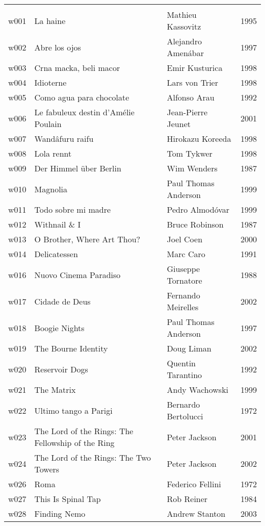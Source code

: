 \documentclass{article}
\begin{document}
\begin {center}
\begin{longtable}{l p{10cm} l l}
\hline
\\
w001 & La haine & Mathieu Kassovitz & 1995 \\
w002 & Abre los ojos & Alejandro Amenábar & 1997 \\
w003 & Crna macka, beli macor & Emir Kusturica & 1998 \\
w004 & Idioterne & Lars von Trier & 1998 \\
w005 & Como agua para chocolate & Alfonso Arau & 1992 \\
w006 & Le fabuleux destin d'Amélie Poulain & Jean-Pierre Jeunet & 2001 \\
w007 & Wandâfuru raifu & Hirokazu Koreeda & 1998 \\
w008 & Lola rennt & Tom Tykwer & 1998 \\
w009 & Der Himmel über Berlin & Wim Wenders & 1987 \\
w010 & Magnolia & Paul Thomas Anderson & 1999 \\
w011 & Todo sobre mi madre & Pedro Almodóvar & 1999 \\
w012 & Withnail \& I & Bruce Robinson & 1987 \\
w013 & O Brother, Where Art Thou? & Joel Coen & 2000 \\
w014 & Delicatessen & Marc Caro & 1991 \\
w016 & Nuovo Cinema Paradiso & Giuseppe Tornatore & 1988 \\
w017 & Cidade de Deus & Fernando Meirelles & 2002 \\
w018 & Boogie Nights & Paul Thomas Anderson & 1997 \\
w019 & The Bourne Identity & Doug Liman & 2002 \\
w020 & Reservoir Dogs & Quentin Tarantino & 1992 \\
w021 & The Matrix & Andy Wachowski & 1999 \\
w022 & Ultimo tango a Parigi & Bernardo Bertolucci & 1972 \\
w023 & The Lord of the Rings: The Fellowship of the Ring & Peter Jackson & 2001 \\
w024 & The Lord of the Rings: The Two Towers & Peter Jackson & 2002 \\
w026 & Roma & Federico Fellini & 1972 \\
w027 & This Is Spinal Tap & Rob Reiner & 1984 \\
w028 & Finding Nemo & Andrew Stanton & 2003 \\

\end{longtable}
\end{center}
\end{document}
